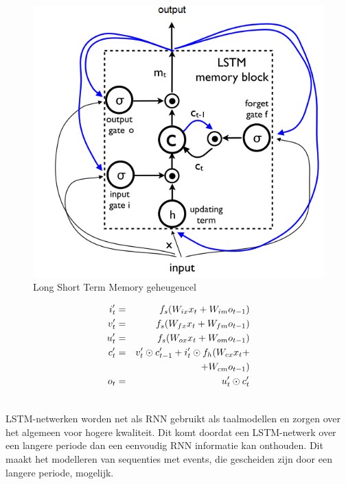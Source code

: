 \begin{figure}[tb]
    \centering
    \includegraphics[width=\linewidth]{Images/lstm.PNG}
    \caption{Long Short Term Memory geheugencel}
    \label{fig:lstm}
\end{figure}

\begin{eqnarray}
\vspace{-3mm}
\label{lstm-memory-start}
i_t' & = & f_s (W_{ix} x_t + W_{im} o_{t-1}) \label{lstm-input} \\
v_t' & = & f_s (W_{fx} x_t + W_{fm} o_{t-1}) \\
u_t' & = & f_s (W_{ox} x_t + W_{om} o_{t-1}) \\
c_t' & = & v_t' \odot c_{t-1}' + i_t' \odot f_h(W_{cx} x_t + \nonumber \\
&   & + W_{cm} o_{t-1}) \\
o_t & = & u_t' \odot c_t'\\
\label{lstm-memory}
\vspace{-3mm}
\end{eqnarray}

LSTM-netwerken worden net als RNN gebruikt als taalmodellen en zorgen over het algemeen voor hogere kwaliteit. Dit komt doordat een LSTM-netwerk over een langere periode dan een eenvoudig RNN informatie kan onthouden. Dit maakt het modelleren van sequenties met events, die gescheiden zijn door een langere periode, mogelijk.


